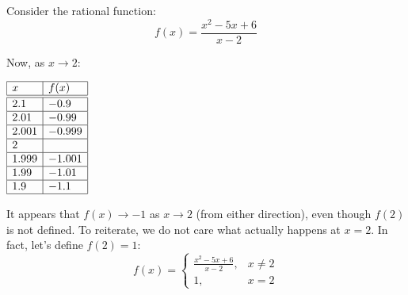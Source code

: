 \documentclass[letterpaper,12pt,fleqn]{article}
\begin{document}
\begin{example}
  Consider the rational function:
  \[f(x)=\frac{x^2-5x+6}{x-2}\]

  \begin{center}
  \end{center}

  Now, as \(x\to2\):

  \bigskip

  \begin{center}
    \(\begin{array}{|l|l|}
    \hline
    x & f(x) \\
    \hline
    \hline
    2.1 & -0.9 \\
    \hline
    2.01 & -0.99 \\
    \hline
    2.001 & -0.999 \\
    \hline
    2 & \\
    \hline
    1.999 & -1.001 \\
    \hline
    1.99 & -1.01 \\
    \hline
    1.9 & -1.1 \\
    \hline
    \end{array}\)
  \end{center}

  \bigskip

  It appears that \(f(x)\to-1\) as \(x\to2\) (from either direction), even though \(f(2)\) is not defined.  To
  reiterate, we do not care what actually happens at \(x=2\).  In fact, let's define \(f(2)=1\):
  \[f(x)=\begin{cases}
  \frac{x^2-5x+6}{x-2}, & x\ne2 \\
  1, & x=2
  \end{cases}\]


\end{example}
\end{document}
